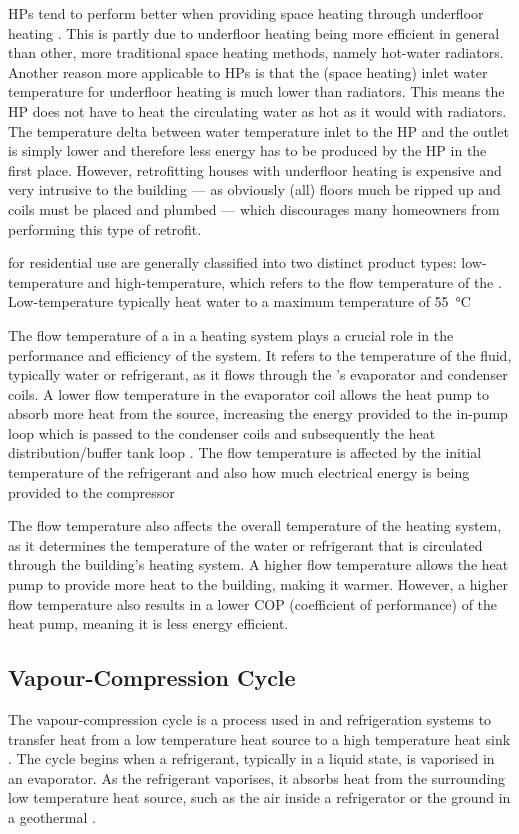 \acp{HP} tend to perform better when providing space heating through underfloor heating \cite{seai_heat_2020}. This is partly due to underfloor heating being more efficient in general than other, more traditional space heating methods, namely hot-water radiators. Another reason more applicable to \acp{HP} is that the (space heating) inlet water temperature for underfloor heating is much lower than radiators. This means the \ac{HP} does not have to heat the circulating water as hot as it would with radiators. The temperature delta between water temperature inlet to the \ac{HP} and the outlet is simply lower and therefore less energy has to be produced by the \ac{HP} in the first place. However, retrofitting houses with underfloor heating is expensive and very intrusive to the building --- as obviously (all) floors much be ripped up and coils must be placed and plumbed --- which discourages many homeowners from performing this type of retrofit.

\HPs for residential use are generally classified into two distinct product types: low-temperature and high-temperature, which refers to the flow temperature of the \HP. Low-temperature \HPs typically heat water to a maximum temperature of \qty{55}{\celsius}

The flow temperature of a \HP in a heating system plays a crucial role in the performance and efficiency of the system. It refers to the temperature of the fluid, typically water or refrigerant, as it flows through the \HP's evaporator and condenser coils. A lower flow temperature in the evaporator coil allows the heat pump to absorb more heat from the source, increasing the energy provided to the in-pump loop which is passed to the condenser coils and subsequently the heat distribution/buffer tank loop \cite{nowak_2018}. The flow temperature is affected by the initial temperature of the refrigerant and also how much electrical energy is being provided to the compressor 

The flow temperature also affects the overall temperature of the heating system, as it determines the temperature of the water or refrigerant that is circulated through the building's heating system. A higher flow temperature allows the heat pump to provide more heat to the building, making it warmer. However, a higher flow temperature also results in a lower COP (coefficient of performance) of the heat pump, meaning it is less energy efficient.

\subsection{Vapour-Compression Cycle}\label{subsec:vapourcompcycle}
The vapour-compression cycle is a process used in \HPs and refrigeration systems to transfer heat from a low temperature heat source to a high temperature heat sink \cite{cengel_thermo_2020}. The cycle begins when a refrigerant, typically in a liquid state, is vaporised in an evaporator. As the refrigerant vaporises, it absorbs heat from the surrounding low temperature heat source, such as the air inside a refrigerator or the ground in a geothermal \HP.

